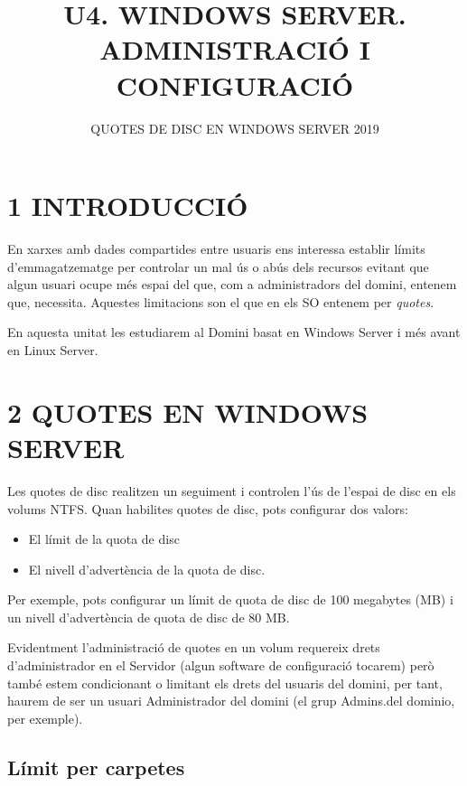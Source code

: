 \documentclass[
  a4paper,
]{article}
\title{U4. WINDOWS SERVER. ADMINISTRACIÓ I CONFIGURACIÓ}
\subtitle{QUOTES DE DISC EN WINDOWS SERVER 2019}
\author{}
\date{\vspace{-2.5em}}
\begin{document}
\maketitle

{
\setcounter{tocdepth}{2}
\tableofcontents
}
\renewcommand\tablename{Tabla}
\newpage

\section{1 INTRODUCCIÓ}\label{introducciuxf3}

En xarxes amb dades compartides entre usuaris ens interessa establir
límits d'emmagatzematge per controlar un mal ús o abús dels recursos
evitant que algun usuari ocupe més espai del que, com a administradors
del domini, entenem que, necessita. Aquestes limitacions son el que en
els SO entenem per \emph{quotes}.

En aquesta unitat les estudiarem al Domini basat en Windows Server i més
avant en Linux Server.

\section{2 QUOTES EN WINDOWS SERVER}\label{quotes-en-windows-server}

Les quotes de disc realitzen un seguiment i controlen l'ús de l'espai de
disc en els volums NTFS. Quan habilites quotes de disc, pots configurar
dos valors:

\begin{itemize}
\item
  El límit de la quota de disc
\item
  El nivell d'advertència de la quota de disc.
\end{itemize}

Per exemple, pots configurar un límit de quota de disc de 100 megabytes
(MB) i un nivell d'advertència de quota de disc de 80 MB.

Evidentment l'administració de quotes en un volum requereix drets
d'administrador en el Servidor (algun software de configuració tocarem)
però també estem condicionant o limitant els drets del usuaris del
domini, per tant, haurem de ser un usuari Administrador del domini (el
grup Admins.del dominio, per exemple).

\subsection{Límit per carpetes}\label{luxedmit-per-carpetes}
\end{document}
